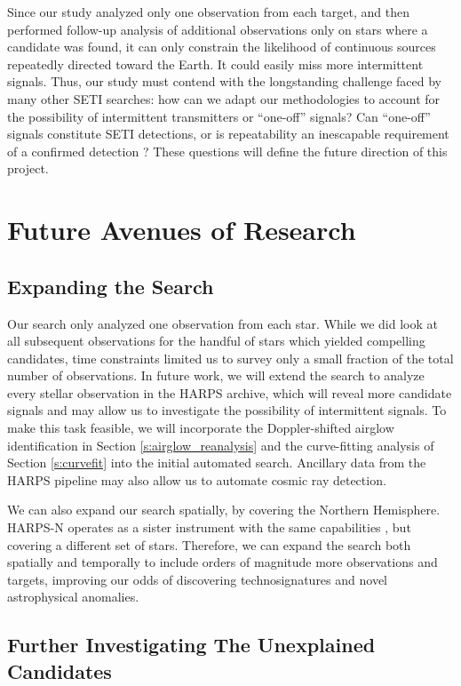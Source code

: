 \documentclass[linenumbers]{aastex631}
\begin{document}
Since our study analyzed only one observation from each target, and then performed follow-up analysis of additional observations only on stars where a candidate was found, it can only constrain the likelihood of continuous sources repeatedly directed toward the Earth.  It could easily miss more intermittent signals. Thus, our study must contend with the longstanding challenge faced by many other SETI searches: how can we adapt our methodologies to account for the possibility of intermittent transmitters or ``one-off'' signals?  Can ``one-off'' signals constitute SETI detections, or is repeatability an inescapable requirement of a confirmed detection \citep{2019nasatechnosignatures, Wow!Signal}? These questions will define the future direction of this project.


\section{Future Avenues of Research}
\subsection{Expanding the Search}
Our search only analyzed one observation from each star. While we did look at all subsequent observations for the handful of stars which yielded compelling candidates, time constraints limited us to survey only a small fraction of the total number of observations.  In future work, we will extend the search to analyze every stellar observation in the HARPS archive, which will reveal more candidate signals and may allow us to investigate the possibility of intermittent signals.  To make this task feasible, we will incorporate the Doppler-shifted airglow identification in Section \ref{s:airglow_reanalysis} and the curve-fitting analysis of Section \ref{s:curvefit} into the initial automated search.  Ancillary data from the HARPS pipeline may also allow us to automate cosmic ray detection.

We can also expand our search spatially, by covering the Northern Hemisphere. HARPS-N operates as a sister instrument with the same capabilities \citep{HARPS_N}, but covering a  different set of stars. Therefore, we can expand the search both spatially and temporally to include orders of magnitude more observations and targets, improving our odds of discovering technosignatures and novel astrophysical anomalies.

\subsection{Further Investigating The Unexplained Candidates}
\end{document}
